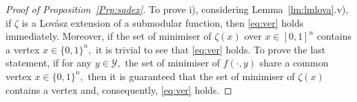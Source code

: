 \documentclass[10pt,a4paper]{amsart}
\begin{document}
\begin{proof}[Proof of Proposition~\ref{Prp:sadex}]
    To prove i), considering Lemma~\ref{lm:lmlova}.v), if $\zeta$ is a Lovász extension of a submodular function, then \eqref{eq:ver} holds immediately. Moreover, if the set of minimiser of $\zeta(x)$ over $x\in[0,1]^n$ contains a vertex $x\in\{0,1\}^n,$ it is trivial to see that \eqref{eq:ver} holds.
    To prove the last statement, if for any $y\in\mathcal{Y},$ the set of minimiser of $f(\cdot ,y)$ share a common vertex $x\in\{0,1\}^n,$ then it is guaranteed that the set of minimiser of $\zeta(x)$ contains a vertex and, consequently, \eqref{eq:ver} holds.
\end{proof}
\end{document}
